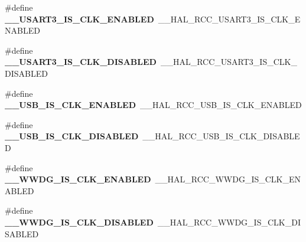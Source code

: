 \begin{DoxyCompactItemize}
\item 
\#define {\bfseries \+\_\+\+\_\+\+U\+S\+A\+R\+T3\+\_\+\+I\+S\+\_\+\+C\+L\+K\+\_\+\+E\+N\+A\+B\+L\+ED}~\+\_\+\+\_\+\+H\+A\+L\+\_\+\+R\+C\+C\+\_\+\+U\+S\+A\+R\+T3\+\_\+\+I\+S\+\_\+\+C\+L\+K\+\_\+\+E\+N\+A\+B\+L\+ED\hypertarget{group___h_a_l___r_c_c___aliased_ga2d73a8b92c06fcea1ec92c9031ef2462}{}\label{group___h_a_l___r_c_c___aliased_ga2d73a8b92c06fcea1ec92c9031ef2462}

\item 
\#define {\bfseries \+\_\+\+\_\+\+U\+S\+A\+R\+T3\+\_\+\+I\+S\+\_\+\+C\+L\+K\+\_\+\+D\+I\+S\+A\+B\+L\+ED}~\+\_\+\+\_\+\+H\+A\+L\+\_\+\+R\+C\+C\+\_\+\+U\+S\+A\+R\+T3\+\_\+\+I\+S\+\_\+\+C\+L\+K\+\_\+\+D\+I\+S\+A\+B\+L\+ED\hypertarget{group___h_a_l___r_c_c___aliased_ga63cc13fc0f33d6f17bf36333cb2d3b54}{}\label{group___h_a_l___r_c_c___aliased_ga63cc13fc0f33d6f17bf36333cb2d3b54}

\item 
\#define {\bfseries \+\_\+\+\_\+\+U\+S\+B\+\_\+\+I\+S\+\_\+\+C\+L\+K\+\_\+\+E\+N\+A\+B\+L\+ED}~\+\_\+\+\_\+\+H\+A\+L\+\_\+\+R\+C\+C\+\_\+\+U\+S\+B\+\_\+\+I\+S\+\_\+\+C\+L\+K\+\_\+\+E\+N\+A\+B\+L\+ED\hypertarget{group___h_a_l___r_c_c___aliased_ga5beb46cff0e9eef7513008300787779a}{}\label{group___h_a_l___r_c_c___aliased_ga5beb46cff0e9eef7513008300787779a}

\item 
\#define {\bfseries \+\_\+\+\_\+\+U\+S\+B\+\_\+\+I\+S\+\_\+\+C\+L\+K\+\_\+\+D\+I\+S\+A\+B\+L\+ED}~\+\_\+\+\_\+\+H\+A\+L\+\_\+\+R\+C\+C\+\_\+\+U\+S\+B\+\_\+\+I\+S\+\_\+\+C\+L\+K\+\_\+\+D\+I\+S\+A\+B\+L\+ED\hypertarget{group___h_a_l___r_c_c___aliased_ga85b0605d36fd5aa803d746eca015176f}{}\label{group___h_a_l___r_c_c___aliased_ga85b0605d36fd5aa803d746eca015176f}

\item 
\#define {\bfseries \+\_\+\+\_\+\+W\+W\+D\+G\+\_\+\+I\+S\+\_\+\+C\+L\+K\+\_\+\+E\+N\+A\+B\+L\+ED}~\+\_\+\+\_\+\+H\+A\+L\+\_\+\+R\+C\+C\+\_\+\+W\+W\+D\+G\+\_\+\+I\+S\+\_\+\+C\+L\+K\+\_\+\+E\+N\+A\+B\+L\+ED\hypertarget{group___h_a_l___r_c_c___aliased_gabf1f0e44cf619dc56ee9cf091be090f6}{}\label{group___h_a_l___r_c_c___aliased_gabf1f0e44cf619dc56ee9cf091be090f6}

\item 
\#define {\bfseries \+\_\+\+\_\+\+W\+W\+D\+G\+\_\+\+I\+S\+\_\+\+C\+L\+K\+\_\+\+D\+I\+S\+A\+B\+L\+ED}~\+\_\+\+\_\+\+H\+A\+L\+\_\+\+R\+C\+C\+\_\+\+W\+W\+D\+G\+\_\+\+I\+S\+\_\+\+C\+L\+K\+\_\+\+D\+I\+S\+A\+B\+L\+ED\hypertarget{group___h_a_l___r_c_c___aliased_ga15d27ad70f9cc20c8a51b4e9eab77349}{}\label{group___h_a_l___r_c_c___aliased_ga15d27ad70f9cc20c8a51b4e9eab77349}


\end{DoxyCompactItemize}
